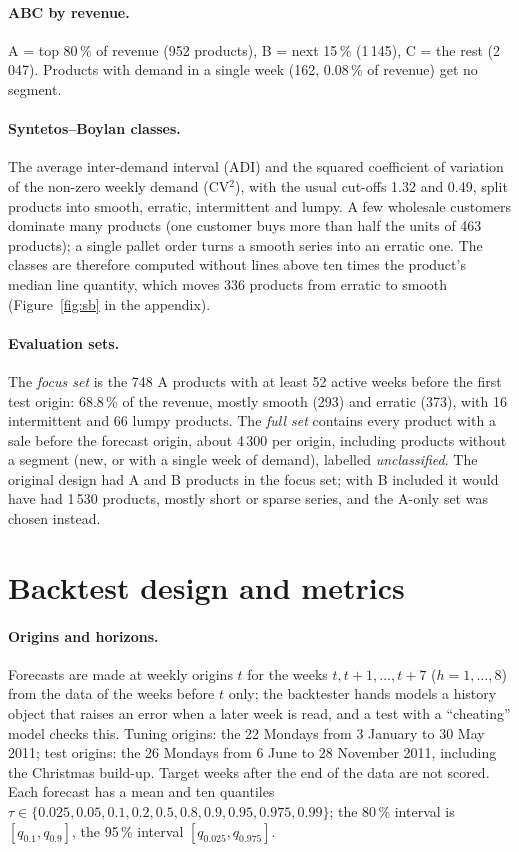 \documentclass[11pt,a4paper]{article}
\begin{document}
\paragraph{ABC by revenue.} A = top 80\,\% of revenue (952 products), B = next 15\,\%
(1\,145), C = the rest (2\,047). Products with demand in a single week (162, 0.08\,\% of
revenue) get no segment.

\paragraph{Syntetos--Boylan classes.} The average inter-demand interval (ADI) and the squared
coefficient of variation of the non-zero weekly demand (CV$^2$), with the usual cut-offs 1.32
and 0.49, split products into smooth, erratic, intermittent and lumpy. A few wholesale customers
dominate many products (one customer buys more than half the units of 463 products); a single
pallet order turns a smooth series into an erratic one. The classes are therefore computed
without lines above ten times the product's median line quantity, which moves 336 products from
erratic to smooth (Figure~\ref{fig:sb} in the appendix).

\paragraph{Evaluation sets.} The \emph{focus set} is the 748 A products with at least 52
active weeks before the first test origin: 68.8\,\% of the revenue, mostly smooth (293) and
erratic (373), with 16 intermittent and 66 lumpy products. The \emph{full set} contains every
product with a sale before the forecast origin, about 4\,300 per origin, including products
without a segment (new, or with a single week of demand), labelled \emph{unclassified}. The original
design had A and B products in the focus set; with B included it would have had 1\,530 products,
mostly short or sparse series, and the A-only set was chosen instead.

\section{Backtest design and metrics}
\label{sec:metrics}

\paragraph{Origins and horizons.} Forecasts are made at weekly origins $t$ for the weeks
$t, t+1, \dots, t+7$ ($h = 1, \dots, 8$) from the data of the weeks before $t$ only; the
backtester hands models a history object that raises an error when a later week is read, and
a test with a ``cheating'' model checks this. Tuning origins: the 22 Mondays from
3 January to 30 May 2011; test origins: the 26 Mondays from 6 June to 28 November 2011,
including the Christmas build-up. Target weeks after the end of the data are not scored.
Each forecast has a mean and ten quantiles $\tau \in \{0.025, 0.05, 0.1, 0.2, 0.5, 0.8, 0.9,
0.95, 0.975, 0.99\}$; the 80\,\% interval is $[q_{0.1}, q_{0.9}]$, the 95\,\% interval
$[q_{0.025}, q_{0.975}]$.
\end{document}
